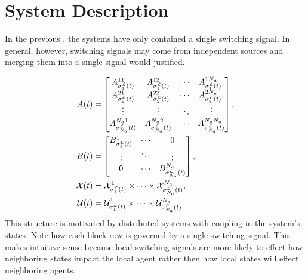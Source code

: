 
\section{System Description}
In the previous , the systems have only contained a single switching signal. In general, however, switching signals may come from independent sources and merging them into a single signal would  justified. 

\begin{subequations}
\label{eq:sys}
\begin{align}
A(t)&=\begin{bmatrix}
A^{11}_{\ssl[1](t)}&A^{12}_{\ssl[1](t)}&\cdots&A^{1\numagents}_{\ssl[1](t)},\\
A^{21}_{\ssl[2](t)}&A^{22}_{\ssl[2](t)}&\cdots&A^{2\numagents}_{\ssl[2](t)},\\
\vdots&\vdots & \ddots & \vdots\\
A^{\numagents 1}_{\ssl[\numagents](t)} & A^{\numagents 2}_{\ssl[\numagents](t)} &\cdots & A^{\numagents \numagents}_{\ssl[\numagents](t)} 
\end{bmatrix},\label{eq:sys_A}\\
B(t)&=\begin{bmatrix}
B^{1}_{\ssl[1](t)} & \cdots & 0\\
\vdots             & \ddots & \vdots\\
0                  & \cdots & B^{\numagents}_{\ssl[\numagents](t)}
\end{bmatrix},\label{eq:sys_B}\\
\xcon(t)&=\xcon[\ssl[1](t)]^1\times\cdots\times\xcon[\ssl[\numagents](t)]^\numagents,\label{eq:sys_X}\\
\ucon(t)&=\ucon[\ssl[1](t)]^1\times\cdots\times\ucon[\ssl[\numagents](t)]^\numagents\label{eq:sys_Y}.
\end{align}
\end{subequations}
This structure is motivated by distributed systems with coupling in the system's states. Note how each block-row is governed by a single switching signal. This makes intuitive sense because local switching signals are more likely to effect how neighboring states impact the local agent rather then how local states will effect neighboring agents.

